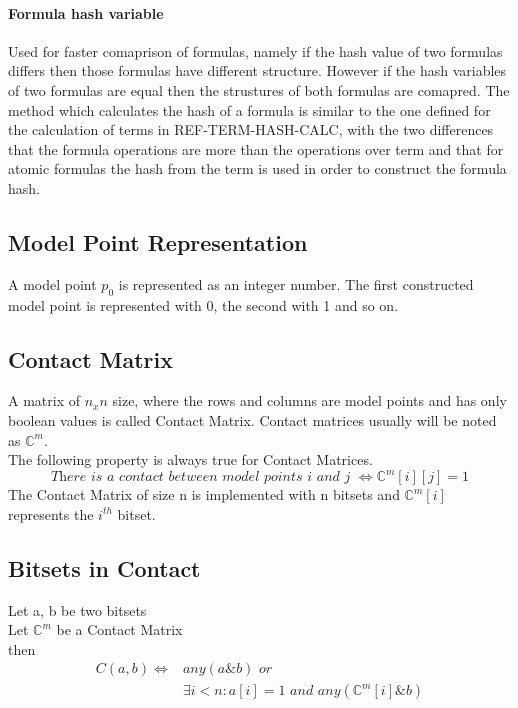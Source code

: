 \documentclass{article}
\begin{document}
	\paragraph{Formula hash variable} Used for faster comaprison of formulas, namely if the hash value of two formulas
	differs then those formulas have different structure. However if the hash variables of two formulas are equal then the strustures 
	of both formulas are comapred. The method which calculates the hash of a formula is similar to the one defined for the 
	calculation of terms in REF-TERM-HASH-CALC, with the two differences that the formula operations are more than the 
	operations over term and that for atomic formulas the hash from the term is used in order to construct the formula hash.

	\subsection{Model Point Representation}
		A model point $p_0$ is represented as an integer number. The first constructed model point is represented with 0, the second with 1 and so on.

	\subsection{Contact Matrix}
		A matrix of $n_x n$ size, where the rows and columns are model points and has only boolean values is called Contact Matrix.
		Contact matrices usually will be noted as $\mathbb{C}^m$. \\
		The following property is always true for Contact Matrices. \\ 
		\begin{equation}
			\textit{There is a contact between model points i and j } \iff \mathbb{C}^m[i][j] = 1
		\end{equation}
		The Contact Matrix of size n is implemented with n bitsets and $\mathbb{C}^m[i]$ represents the $i^{th}$ bitset.

	\subsection{Bitsets in Contact}
	Let a, b be two bitsets \\
	Let $\mathbb{C}^m$ be a Contact Matrix\\
	then
	\begin{align*}
		C(a, b) \iff &any(a \& b) \textit{ or } \\
		&\exists i < n : a[i]=1 \textit{ and } any(\mathbb{C}^m[i] \& b)
	\end{align*}
\end{document}
